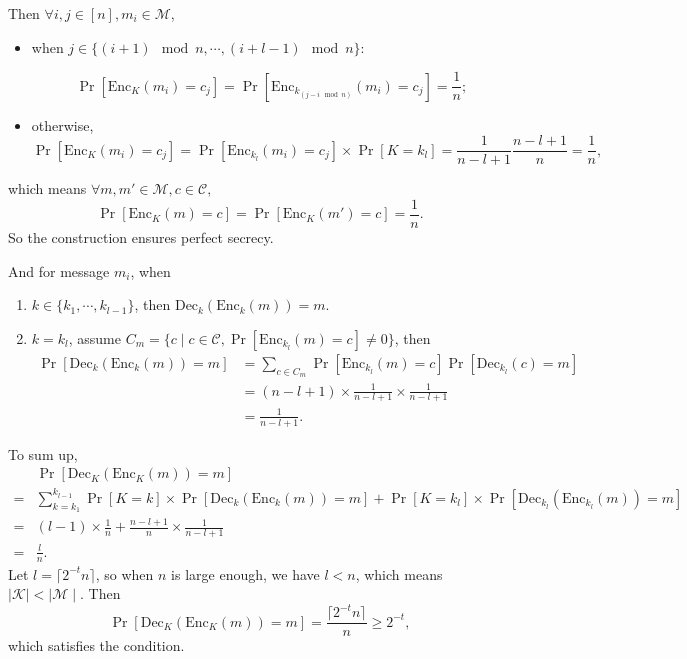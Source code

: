 \documentclass[12pt]{article}
\newcommand{\K}{\mathcal{K}}
\newcommand{\M}{\mathcal{M}}
\newcommand{\C}{\mathcal{C}}
\newcommand{\Enc}{\text{Enc}}
\newcommand{\Dec}{\text{Dec}}
\newenvironment{problem}[2][Problem]{\begin{trivlist}
\item[\hskip \labelsep {\bfseries #1}\hskip \labelsep {\bfseries #2.}]}{\end{trivlist}}
\begin{document}
\begin{problem}{2.11}
Then $\forall i,j\in[n],m_i\in\M$,
\begin{itemize}
    \item when $j\in\{(i+1)\mod n,\cdots, (i+l-1)\mod n\}:$ \par $$\Pr[\Enc_{K}(m_i)=c_j]=\Pr[\Enc_{k_{(j-i \mod n)}}(m_i)=c_j]=\frac1n;$$
    \item otherwise, $$\Pr[\Enc_{K}(m_i)=c_j]=\Pr[\Enc_{k_l}(m_i)=c_j]\times\Pr[K=k_l]=\frac{1}{n-l+1}\frac{n-l+1}{n}=\frac 1n,$$
\end{itemize}
which means $\forall m,m'\in\M, c\in\C,$
\[\Pr[\Enc_{K}(m)=c]=\Pr[\Enc_{K}(m')=c]=\frac1n.\]
So the construction ensures perfect secrecy.\par
And for message $m_i$, when
\begin{enumerate}
    \item $k\in\{k_1,\cdots,k_{l-1}\}$, then $\Dec_k(\Enc_k(m))=m$.
    \item $k=k_l$, assume $C_m=\{c\mid c\in\C, \Pr[\Enc_{k_l}(m)=c]\ne 0\}$, then
    \begin{align*}
        \Pr[\Dec_k(\Enc_k(m))=m]
        &=\sum_{c\in C_m}\Pr[\Enc_{k_l}(m)=c]\Pr[\Dec_{k_l}(c)=m]\\
        &=(n-l+1)\times\frac{1}{n-l+1}\times\frac{1}{n-l+1}\\
        &=\frac {1}{n-l+1}.
    \end{align*}
    \end{enumerate}
    To sum up, \begin{align*}
        &\Pr[\Dec_K(\Enc_K(m))=m]\\
        =&\sum_{k=k_1}^{k_{l-1}}\Pr[K=k]\times\Pr[\Dec_k(\Enc_k(m))=m]+\Pr[K=k_l]\times\Pr[\Dec_{k_l}(\Enc_{k_l}(m))=m] \\
        =&(l-1)\times\frac1n+\frac{n-l+1}{n}\times\frac{1}{n-l+1}\\
        =&\frac {l}{n}.
    \end{align*}
    Let $l=\lceil2^{-t}n\rceil$, so when $n$ is large enough, we have $l<n$, which means $\mid\K\mid<\mid\M\mid$. Then $$\Pr[\Dec_K(\Enc_K(m))=m]=\frac{\lceil2^{-t}n\rceil}{n}\ge2^{-t},$$ which satisfies the condition.
    \vspace{3ex}
    

\end{problem}
\end{document}
